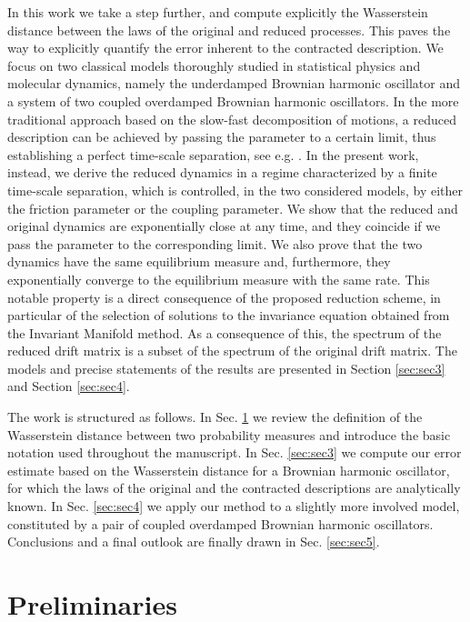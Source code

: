 \documentclass[a4paper,twoside]{article}      %
\theoremstyle{definition}
\begin{document}
In this work we take a step further, and compute explicitly the Wasserstein distance between the laws of the original and reduced processes. This paves the way to explicitly quantify the error inherent to the contracted description.
We focus on two classical models thoroughly studied in statistical physics and molecular dynamics, namely the underdamped Brownian harmonic oscillator and a system of two coupled overdamped Brownian harmonic oscillators. In the more traditional approach based on the slow-fast decomposition of motions, a reduced description can be achieved by passing the parameter to a certain limit, thus establishing a perfect time-scale separation, see e.g. \cite{Zwanzig,Ghil}. In the present work, instead, we derive the reduced dynamics in a regime characterized by a finite time-scale separation, which is controlled, in the two considered models, by either the friction parameter or the coupling parameter. We show that the reduced and original dynamics are exponentially close at any time, and they coincide if we pass the parameter to the corresponding limit. We also prove that the two dynamics have the same equilibrium measure and, furthermore, they exponentially converge to the equilibrium measure with the same rate. This notable property is a direct consequence of the proposed reduction scheme, in particular of the selection of solutions to the invariance equation obtained from the Invariant Manifold method. As a consequence of this, the spectrum of the reduced drift matrix is a subset of the spectrum of the original drift matrix. The models and precise statements of the results are presented in Section \ref{sec:sec3} and Section \ref{sec:sec4}.

The work is structured as follows. In Sec. \ref{sec:sec2} we review the definition of the Wasserstein distance between two probability measures and introduce the basic notation used throughout the manuscript. In Sec. \ref{sec:sec3} we compute our error estimate based on the Wasserstein distance for a Brownian harmonic oscillator, for which the laws of the original and the contracted descriptions are analytically known. In Sec. \ref{sec:sec4} we apply our method to a slightly more involved model, constituted by a pair of coupled overdamped Brownian harmonic oscillators. Conclusions and a final outlook are finally drawn in Sec. \ref{sec:sec5}.


\section{Preliminaries}
\label{sec:sec2}
\end{document}
